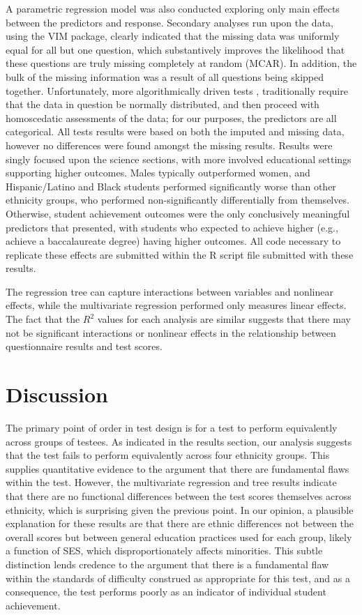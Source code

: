 \documentclass{article}\usepackage[]{graphicx}\usepackage[]{color}
\begin{document}
A parametric regression model was also conducted exploring only main effects between the predictors and response. Secondary analyses run upon the data, using the VIM package, clearly indicated that the missing data was uniformly equal for all but one question, which substantively improves the likelihood that these questions are truly missing completely at random (MCAR). In addition, the bulk of the missing information was a result of all questions being skipped together. Unfortunately, more algorithmically driven tests \cite{little,KB}, traditionally require that the data in question be normally distributed, and then proceed with homoscedatic assessments of the data; for our purposes, the predictors are all categorical. All tests results were based on both the imputed and missing data, however no differences were found amongst the missing results. Results were singly focused upon the science sections, with more involved educational settings supporting higher outcomes. Males typically outperformed women, and Hispanic/Latino and Black students performed significantly worse than other ethnicity groups, who performed non-significantly differentially from themselves. Otherwise, student achievement outcomes were the only conclusively meaningful predictors that presented, with students who expected to achieve higher (e.g., achieve a baccalaureate degree) having higher outcomes. All code necessary to replicate these effects are submitted within the R script file submitted with these results.

The regression tree can capture interactions between variables and nonlinear effects, while the multivariate regression performed only measures linear effects. The fact that the $R^2$ values for each analysis are similar suggests that there may not be significant interactions or nonlinear effects in the relationship between questionnaire results and test scores. 

\section{Discussion}

The primary point of order in test design is for a test to perform equivalently across groups of testees. As indicated in the results section, our analysis suggests that the test fails to perform equivalently across four ethnicity groups. This supplies quantitative evidence to the argument that there are fundamental flaws within the test. However, the multivariate regression and tree results indicate that there are no functional differences between the test scores themselves across ethnicity, which is surprising given the previous point. In our opinion, a plausible explanation for these results are that there are ethnic differences not between the overall scores but between general education practices used for each group, likely a function of SES, which disproportionately affects minorities. This subtle distinction lends credence to the argument that there is a fundamental flaw within the standards of difficulty construed as appropriate for this test, and as a consequence, the test performs poorly as an indicator of individual student achievement.
\end{document}
